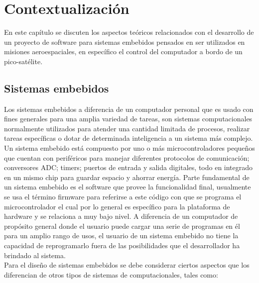 \documentclass[11pt,letterpaper]{article}
\begin{document}
\section{Contextualización}

En este capítulo se discuten los aspectos teóricos relacionados con el desarrollo de un proyecto de software para sistemas embebidos pensados en ser utilizados en misiones aeroespaciales, en específico el control del computador a bordo de un pico-satélite.

\subsection{Sistemas embebidos}

Los sistemas embebidos a diferencia de un computador personal que es usado con fines generales para una amplia variedad de tareas, son sistemas computacionales normalmente utilizados para atender una cantidad limitada de procesos, realizar tareas específicas o dotar de determinada inteligencia a un sistema más complejo. Un sistema embebido está compuesto por uno o más microcontroladores pequeños que cuentan con periféricos para manejar diferentes protocolos de comunicación; conversores ADC; timers; puertos de entrada y salida digitales, todo en integrado en un mismo chip para guardar espacio y ahorrar energía. Parte fundamental de un sistema embebido es el software que provee la funcionalidad final, usualmente se usa el término firmware para referirse a este código con que se programa el microcontrolador el cual por lo general es específico para la plataforma de hardware y se relaciona a muy bajo nivel. A diferencia de un computador de propósito general donde el usuario puede cargar una serie de programas en 
él para un amplio rango de usos, el usuario de un sistema embebido no tiene la capacidad de reprogramarlo fuera de las posibilidades que el desarrollador ha brindado al sistema\cite{EMBEDDED}.\\

Para el diseño de sistemas embebidos se debe considerar ciertos aspectos que los diferencian de otros tipos de sistemas de computacionales, tales como\cite{SE}:
\end{document}
